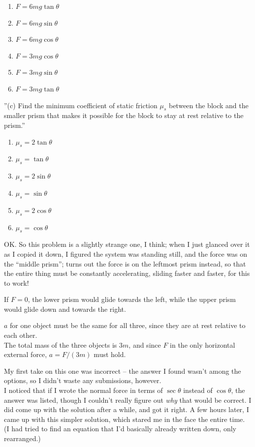 \documentclass[8.01x]{subfiles}
\begin{document}
\begin{enumerate}
\item $F = 6 m g \tan \theta$
\item $F = 6 m g \sin \theta$
\item $F = 6 m g \cos \theta$
\item $F = 3 m g \cos \theta$
\item $F = 3 m g \sin \theta$
\item $F = 3 m g \tan \theta$
\end{enumerate}

''(c) Find the minimum coefficient of static friction $\mu_s$ between the block and the smaller prism that makes it possible for the block to stay at rest relative to the prism.''

\begin{enumerate}
\item $\mu_s = 2 \tan \theta$
\item $\mu_s = \tan \theta$
\item $\mu_s = 2 \sin \theta$
\item $\mu_s = \sin \theta$
\item $\mu_s = 2 \cos \theta$
\item $\mu_s = \cos \theta$
\end{enumerate}

OK. So this problem is a slightly strange one, I think; when I just glanced over it as I copied it down, I figured the system was standing still, and the force was on the ``middle prism''; turns out the force is on the leftmost prism instead, so that the entire thing must be constantly accelerating, sliding faster and faster, for this to work!

If $F = 0$, the lower prism would glide towards the left, while the upper prism would glide down and towards the right.

$a$ for one object must be the same for all three, since they are at rest relative to each other.\\
The total mass of the three objects is $3m$, and since $F$ in the only horizontal external force, $a = F/(3m)$ must hold.

My first take on this one was incorrect -- the answer I found wasn't among the options, so I didn't waste any submissions, however.\\
I noticed that if I wrote the normal force in terms of $\sec\theta$ instead of $\cos\theta$, the answer was listed, though I couldn't really figure out \emph{why} that would be correct. I did come up with the solution after a while, and got it right. A few hours later, I came up with this simpler solution, which stared me in the face the entire time. (I had tried to find an equation that I'd basically already written down, only rearranged.)
\end{document}
